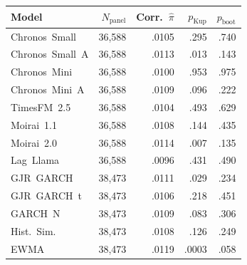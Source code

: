 \begin{tabular}{@{}lrrrr@{}}
\toprule
Model & $N_{\text{panel}}$ & Corr.\ $\hat\pi$ & $p_{\text{Kup}}$ & $p_{\text{boot}}$ \\
\midrule
Chronos~Small & 36{,}588 & .0105 & .295 & .740 \\
Chronos~Small~A & 36{,}588 & .0113 & .013 & .143 \\
Chronos~Mini & 36{,}588 & .0100 & .953 & .975 \\
Chronos~Mini~A & 36{,}588 & .0109 & .096 & .222 \\
TimesFM~2.5 & 36{,}588 & .0104 & .493 & .629 \\
\midrule
Moirai~1.1 & 36{,}588 & .0108 & .144 & .435 \\
Moirai~2.0 & 36{,}588 & .0114 & .007 & .135 \\
Lag~Llama & 36{,}588 & .0096 & .431 & .490 \\
GJR~GARCH & 38{,}473 & .0111 & .029 & .234 \\
GJR~GARCH~t & 38{,}473 & .0106 & .218 & .451 \\
GARCH~N & 38{,}473 & .0109 & .083 & .306 \\
Hist.\ Sim. & 38{,}473 & .0108 & .126 & .249 \\
EWMA & 38{,}473 & .0119 & .0003 & .058 \\
\bottomrule
\end{tabular}
